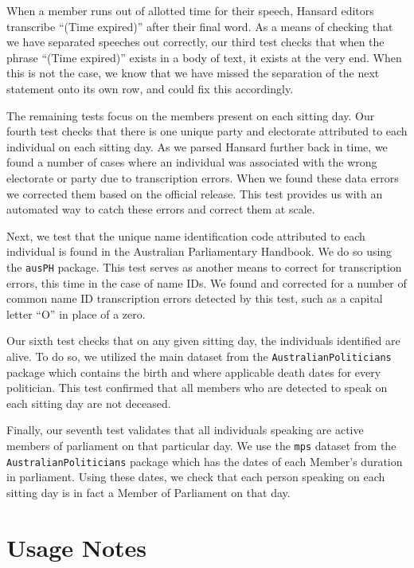 \documentclass[
  letterpaper,
  DIV=11,
  numbers=noendperiod]{scrartcl}
\begin{document}
When a member runs out of allotted time for their speech, Hansard
editors transcribe ``(Time expired)'' after their final word. As a means
of checking that we have separated speeches out correctly, our third
test checks that when the phrase ``(Time expired)'' exists in a body of
text, it exists at the very end. When this is not the case, we know that
we have missed the separation of the next statement onto its own row,
and could fix this accordingly.

The remaining tests focus on the members present on each sitting day.
Our fourth test checks that there is one unique party and electorate
attributed to each individual on each sitting day. As we parsed Hansard
further back in time, we found a number of cases where an individual was
associated with the wrong electorate or party due to transcription
errors. When we found these data errors we corrected them based on the
official release. This test provides us with an automated way to catch
these errors and correct them at scale.

Next, we test that the unique name identification code attributed to
each individual is found in the Australian Parliamentary Handbook. We do
so using the \texttt{ausPH} package. This test serves as another means
to correct for transcription errors, this time in the case of name IDs.
We found and corrected for a number of common name ID transcription
errors detected by this test, such as a capital letter ``O'' in place of
a zero.

Our sixth test checks that on any given sitting day, the individuals
identified are alive. To do so, we utilized the main dataset from the
\texttt{AustralianPoliticians} package which contains the birth and
where applicable death dates for every politician. This test confirmed
that all members who are detected to speak on each sitting day are not
deceased.

Finally, our seventh test validates that all individuals speaking are
active members of parliament on that particular day. We use the
\texttt{mps} dataset from the \texttt{AustralianPoliticians} package
which has the dates of each Member's duration in parliament. Using these
dates, we check that each person speaking on each sitting day is in fact
a Member of Parliament on that day.

\hypertarget{sec-usage}{%
\section{Usage Notes}\label{sec-usage}}
\end{document}
